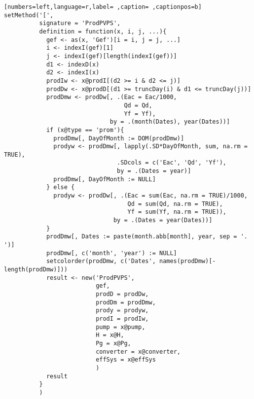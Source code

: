 \begin{lstlisting}[numbers=left,language=r,label= ,caption= ,captionpos=b]
setMethod('[',
          signature = 'ProdPVPS',
          definition = function(x, i, j, ...){
            gef <- as(x, 'Gef')[i = i, j = j, ...] 
            i <- indexI(gef)[1]
            j <- indexI(gef)[length(indexI(gef))]
            d1 <- indexD(x)
            d2 <- indexI(x)
            prodIw <- x@prodI[(d2 >= i & d2 <= j)]
            prodDw <- x@prodD[(d1 >= truncDay(i) & d1 <= truncDay(j))]
            prodDmw <- prodDw[, .(Eac = Eac/1000,
                                  Qd = Qd,
                                  Yf = Yf),
                              by = .(month(Dates), year(Dates))]
            if (x@type == 'prom'){
              prodDmw[, DayOfMonth := DOM(prodDmw)]
              prodyw <- prodDmw[, lapply(.SD*DayOfMonth, sum, na.rm = TRUE),
                                .SDcols = c('Eac', 'Qd', 'Yf'),
                                by = .(Dates = year)]
              prodDmw[, DayOfMonth := NULL]
            } else {
              prodyw <- prodDw[, .(Eac = sum(Eac, na.rm = TRUE)/1000,
                                   Qd = sum(Qd, na.rm = TRUE),
                                   Yf = sum(Yf, na.rm = TRUE)),
                               by = .(Dates = year(Dates))]
            }
            prodDmw[, Dates := paste(month.abb[month], year, sep = '. ')]
            prodDmw[, c('month', 'year') := NULL]
            setcolorder(prodDmw, c('Dates', names(prodDmw)[-length(prodDmw)]))
            result <- new('ProdPVPS',
                          gef,
                          prodD = prodDw,
                          prodDm = prodDmw,
                          prody = prodyw,
                          prodI = prodIw,
                          pump = x@pump,
                          H = x@H,
                          Pg = x@Pg,
                          converter = x@converter,
                          effSys = x@effSys
                          )
            result
          }
          )
\end{lstlisting}
